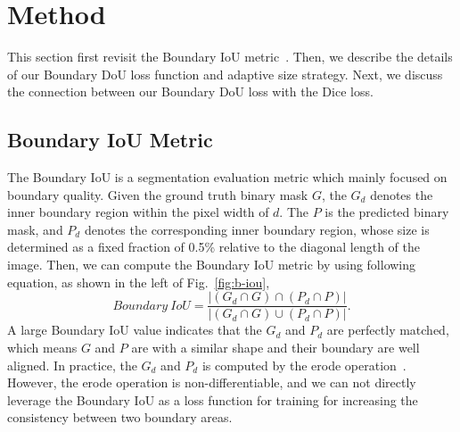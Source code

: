 \documentclass[runningheads]{llncs}
\begin{document}
\section{Method}
\label{sec:pagestyle}

This section first revisit the Boundary IoU metric~\cite{cheng2021boundary}. Then, we describe the details of our Boundary DoU loss function and adaptive size strategy. Next, we discuss the connection between our Boundary DoU loss with the Dice loss. %

\subsection{Boundary IoU Metric}

The Boundary IoU is a segmentation evaluation metric which mainly focused on boundary quality. Given the ground truth binary mask $G$, the $G_d$ denotes the inner boundary region within the pixel width of $d$. The $P$ is the predicted binary mask, and $P_d$ denotes the corresponding inner boundary region, whose size is determined as a fixed fraction of 0.5\% relative to the diagonal length of the image. Then, we can compute the Boundary IoU metric by using following equation, as shown in the left of Fig.~\ref{fig:b-iou}, 
\begin{equation}
Boundary \ IoU = \frac{|(G_d\cap G)\cap(P_d\cap P)|}{|(G_d\cap G)\cup (P_d\cap P)|}.
\end{equation}
A large Boundary IoU value indicates that the $G_d$ and $P_d$ are perfectly matched, which means $G$ and $P$ are with a similar shape and their boundary are well aligned. In practice, the $G_d$ and $P_d$ is computed by the erode operation~\cite{cheng2021boundary}. However, the erode operation is non-differentiable, and we can not directly leverage the Boundary IoU as a loss function for training for increasing the consistency between two boundary areas.

\end{document}
